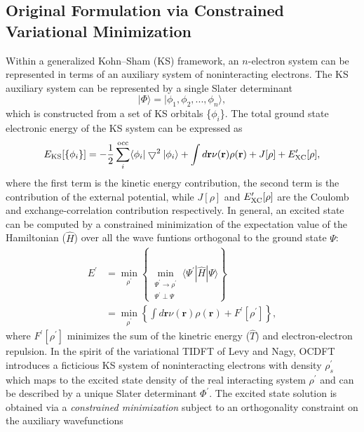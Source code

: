 \documentclass{article}
\begin{document}
\subsection{Original Formulation via Constrained Variational Minimization}
Within a generalized Kohn--Sham (KS) framework, an $n$-electron system can be represented in terms of an auxiliary system of noninteracting electrons. \cite{hohenberg_inhomogeneous_1964,kohn_self-consistent_1965} The KS auxiliary system can be represented by a single Slater determinant 
\begin{equation}
|\Phi\rangle = | \phi_1, \phi_2, ..., \phi_n \rangle,
\end{equation}
which is constructed from a set of KS orbitals \{$\phi_i$\}. The total ground state electronic energy of the KS system can be expressed as
\begin{equation}
E_{\rm KS}[\{\phi_i\}] = - \frac{1}{2} \sum^{\rm occ}_i \langle \phi_i| \bigtriangledown^2 | \phi_i \rangle + \int d\mathbf{r} \nu(\mathbf{r}) \rho(\mathbf{r}) + J[\rho] + E^{\prime}_{\rm XC}[\rho],
\end{equation}
where the first term is the kinetic energy contribution, the second term is the contribution of the external potential, while $J[\rho]$ and $E^{\prime}_{\rm XC}[\rho]$ are the Coulomb and exchange-correlation contribution respectively. In general, an excited state can be computed by a constrained minimization of the expectation value of the Hamiltonian ($\hat{H}$) over all the wave funtions orthogonal to the ground state $\Psi$:
\begin{align}
E^{\prime} &= \min_{\rho^{\prime}}\left\{\min_{\substack{\Psi^{\prime} \rightarrow \rho^{\prime} \\ \Psi^{\prime} \perp \Psi}} \langle \Psi^{\prime}| \hat{H} | \Psi\rangle \right\} \\
&= \min_{\rho^{\prime}}\left\{ \int d\mathbf{r} \nu(\mathbf{r}) \rho(\mathbf{r}) + F^{\prime}[\rho^{\prime}]\right\},
\end{align}
where $F^{\prime}[\rho^{\prime}]$ minimizes the sum of the kinetric energy ($\hat{T}$) and electron-electron repulsion. In the spirit of the variational TIDFT of Levy and Nagy, OCDFT introduces a ficticious KS system of noninteracting electrons with density $\rho^{\prime}_s$ which maps to the excited state density of the real interacting system $\rho^{\prime}$ and can be described by a unique Slater determinant $\Phi^{\prime}$. The excited state solution is obtained via a \textit{constrained minimization} subject to an orthogonality constraint on the auxiliary wavefunctions
\end{document}
